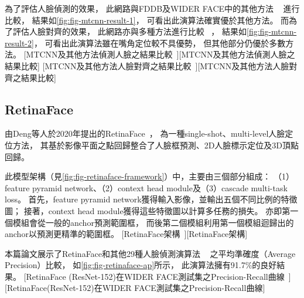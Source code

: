 \documentclass[class=NCU_thesis, crop=false]{standalone}
\begin{document}
為了評估人臉偵測的效果，
此網路與FDDB及WIDER FACE中的其他方法
~\cite{yang_aggregate_2014, mathias_face_2014, yan_fastest_2014, yang_facial_2015, chen_joint_2014, li_convolutional_2015, yang_convolutional_2015, farfade_multi-view_2015, yang_wider_2015}
進行比較，
結果如\cref{fig:fig-mtcnn-result-1}，
可看出此演算法確實優於其他方法。
而為了評估人臉對齊的效果，
此網路亦與多種方法進行比較
~\cite{cao_face_2014, yu_pose-free_2013, xiong_supervised_2013, burgos-artizzu_robust_2013, zhu_face_2012, zhang_facial_2014}，
結果如\cref{fig:fig-mtcnn-result-2}，
可看出此演算法雖在嘴角定位較不具優勢，
但其他部分仍優於多數方法。
[MTCNN及其他方法偵測人臉之結果比較~\cite{zhang_joint_2016}][MTCNN及其他方法偵測人臉之結果比較]
[MTCNN及其他方法人臉對齊之結果比較~\cite{zhang_joint_2016}][MTCNN及其他方法人臉對齊之結果比較]

\subsection{RetinaFace}
由Deng等人於2020年提出的RetinaFace~\cite{deng_retinaface_2020}，
為一種single-shot、multi-level人臉定位方法，
其基於影像平面之點回歸整合了人臉框預測、2D人臉標示定位及3D頂點回歸。

此模型架構（見\cref{fig:fig-retinaface-framework}）中，主要由三個部分組成：
（1）feature pyramid network、（2）context head module及（3）cascade multi-task loss。
首先，feature pyramid network獲得輸入影像，並輸出五個不同比例的特徵圖；
接著，context head module獲得這些特徵圖以計算多任務的損失。
亦即第一個模組會從一般的anchor預測範圍框，
而後第二個模組利用第一個模組迴歸出的anchor以預測更精準的範圍框。
[RetinaFace架構~\cite{deng_retinaface_2020}][RetinaFace架構]

本篇論文展示了RetinaFace和其他29種人臉偵測演算法
~\cite{zhang_single-shot_2019, tang_pyramidbox_2018, najibi_ssh_2017, zhang_s3fd_2017, li_dsfd_2019}
之平均準確度（Average Precision）比較，
如\cref{fig:fig-retinaface-ap}所示，
此演算法擁有91.7\%的良好結果。
[RetinaFace (ResNet-152)在WIDER FACE測試集之Precision-Recall曲線~\cite{deng_retinaface_2020}][RetinaFace(ResNet-152)在WIDER FACE測試集之Precision-Recall曲線]
\end{document}

